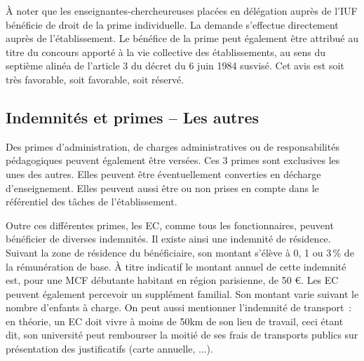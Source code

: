 \`A noter que les enseignant\mp e\mp s-chercheur\mp euse\mp s plac\'e\mp e\mp s en d\'el\'egation aupr\`es de l'IUF b\'en\'eficie de droit de la prime individuelle. La demande s'effectue directement aupr\`es de l'\'etablissement. Le b\'en\'efice de la prime peut \'egalement être attribu\'e au titre du concours apport\'e \`a la vie collective des \'etablissements, au sens du septi\`eme alin\'ea de l'article 3 du d\'ecret du 6 juin 1984 susvis\'e. Cet avis est soit tr\`es favorable, soit favorable, soit r\'eserv\'e.


\subsection{Indemnit\'es et primes -- Les autres}

Des primes d'administration, de charges administratives ou de
responsabilit\'es p\'edagogiques peuvent \'egalement \^etre
vers\'ees. Ces 3 primes sont exclusives les unes des autres.
Elles peuvent \^etre \'even\-tuel\-lement converties en d\'echarge d'enseignement. Elles peuvent
aussi \^etre ou non prises en compte dans le r\'ef\'erentiel des t\^aches de l'\'etablissement.

Outre ces diff\'erentes primes, les EC, comme tous les
fonctionnaires, peuvent b\'en\'eficier de diverses indemnit\'es. Il
existe ainsi une indemnit\'e de r\'esidence. Suivant la zone de
r\'esidence du b\'en\'eficiaire, son montant s'\'el\`eve \`a 0, 1 ou
3\,\% de la r\'emun\'eration de base. \`A titre indicatif le montant
annuel de cette indemnit\'e est, pour un\mp e MCF d\'ebutant\mp e habitant en
r\'egion parisienne, de 50 \euro{}. Les EC peuvent \'egalement
percevoir un suppl\'ement familial. Son montant varie suivant le
nombre d'enfants \`a charge. 
On peut aussi mentionner l'indemnit\'e de transport~: 
en th\'eorie, un EC doit vivre \`a moins de 50km de son lieu de travail, 
ceci \'etant dit, son universit\'e peut rembourser la moiti\'e de ses frais de transports publics sur pr\'esentation des justificatifs (carte annuelle, ...).

